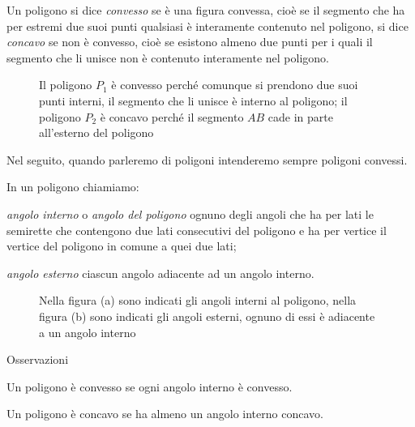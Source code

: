 \begin{definizione}
Un poligono si dice \emph{convesso} se è una figura convessa, cioè se 
il segmento che ha per estremi due suoi punti qualsiasi è interamente 
contenuto nel poligono, si dice \emph{concavo} se non è convesso, 
cioè se esistono almeno due punti per i quali il segmento che li 
unisce non è contenuto interamente nel poligono.
\end{definizione}


\begin{inaccessibleblock}
 \begin{figure}[htb]
\centering
\caption{Il poligono \(P_1\) è convesso perché comunque si prendono due 
suoi punti interni, il segmento che li unisce è interno al poligono; 
il poligono \(P_2\) è concavo perché il segmento \(AB\) cade in parte 
all'esterno del poligono}
\end{figure}
\end{inaccessibleblock}

Nel seguito, quando parleremo di poligoni intenderemo sempre poligoni 
convessi.

\begin{definizione}
In un poligono chiamiamo:
\begin{itemize*}
\item \emph{angolo interno} o \emph{angolo del poligono} ognuno degli 
angoli che ha per lati le semirette che contengono due lati 
consecutivi del poligono e ha per vertice il vertice del poligono in 
comune a quei due lati;
\item \emph{angolo esterno} ciascun angolo adiacente ad un angolo 
interno.
\end{itemize*}
\end{definizione}


\begin{inaccessibleblock}
 \begin{figure}[htb]
\centering
\caption{Nella figura (a) sono indicati gli angoli interni al 
poligono, nella figura (b) sono indicati gli angoli esterni, ognuno 
di essi è adiacente a un angolo interno}
\end{figure}
\end{inaccessibleblock}

Osservazioni
\begin{itemize*}
\item Un poligono è convesso se ogni angolo interno è convesso.
\item Un poligono è concavo se ha almeno un angolo interno concavo.
\end{itemize*}

